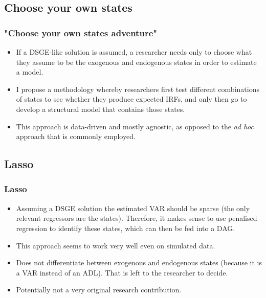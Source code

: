 \documentclass{beamer}
\begin{document}
\subsection{Choose your own states}
\begin{frame}
    \frametitle{"Choose your own states adventure"}
    \begin{itemize}
        \item If a DSGE-like solution is assumed, a researcher needs only to choose what they assume to be the exogenous and endogenous states in order to estimate a model.
        \item I propose a methodology whereby researchers first test different combinations of states to see whether they produce expected IRFs, and only then go to develop a structural model that contains those states.
        \item This approach is data-driven and mostly agnostic, as opposed to the \textit{ad hoc} approach that is commonly employed.
    \end{itemize}
\end{frame}

\subsection{Lasso}
\begin{frame}
    \frametitle{Lasso}
    \begin{itemize}
        \item Assuming a DSGE solution the estimated VAR should be sparse (the only relevant regressors are the states). Therefore, it makes sense to use penalised regression to identify these states, which can then be fed into a DAG.
        \item This approach seems to work very well even on simulated data.
        \item Does not differentiate between exogenous and endogenous states (because it is a VAR instead of an ADL). That is left to the researcher to decide.
        \item Potentially not a very original research contribution.
    \end{itemize}
\end{frame}
\end{document}
